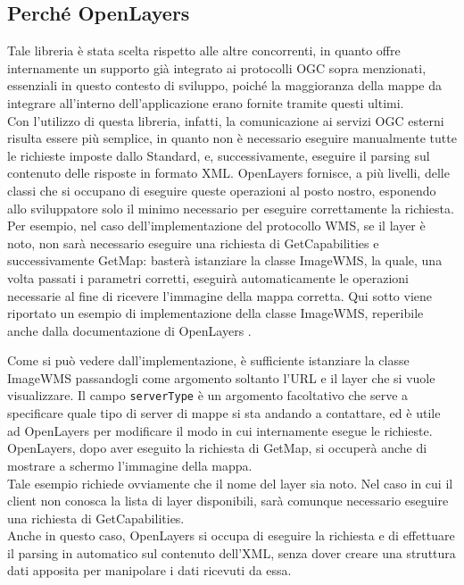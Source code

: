\subsection{Perché OpenLayers}

Tale libreria è stata scelta rispetto alle altre concorrenti, in quanto offre internamente un supporto già integrato ai protocolli OGC sopra menzionati, essenziali in questo contesto di sviluppo, poiché la maggioranza della mappe da integrare all'interno dell'applicazione erano fornite tramite questi ultimi.
\\Con l'utilizzo di questa libreria, infatti, la comunicazione ai servizi OGC esterni risulta essere più semplice, in quanto non è necessario eseguire manualmente tutte le richieste imposte dallo Standard, e, successivamente, eseguire il parsing sul contenuto delle risposte in formato XML. OpenLayers fornisce, a più livelli, delle classi che si occupano di eseguire queste operazioni al posto nostro, esponendo allo sviluppatore solo il minimo necessario per eseguire correttamente la richiesta.
\\Per esempio, nel caso dell'implementazione del protocollo WMS, se il layer è noto, non sarà necessario eseguire una richiesta di GetCapabilities e successivamente GetMap: basterà istanziare la classe ImageWMS, la quale, una volta passati i parametri corretti, eseguirà automaticamente le operazioni necessarie al fine di ricevere l'immagine della mappa corretta. Qui sotto viene riportato un esempio di implementazione della classe ImageWMS, reperibile anche dalla documentazione di OpenLayers \cite{DocumentazioneOpenLayersWMS}.

Come si può vedere dall'implementazione, è sufficiente istanziare la classe ImageWMS passandogli come argomento soltanto l'URL e il layer che si vuole visualizzare. Il campo \verb|serverType| è un argomento facoltativo che serve a specificare quale tipo di server di mappe si sta andando a contattare, ed è utile ad OpenLayers per modificare il modo in cui internamente esegue le richieste. OpenLayers, dopo aver eseguito la richiesta di GetMap, si occuperà anche di mostrare a schermo l'immagine della mappa.
\\Tale esempio richiede ovviamente che il nome del layer sia noto. Nel caso in cui il client non conosca la lista di layer disponibili, sarà comunque necessario eseguire una richiesta di GetCapabilities.
\\Anche in questo caso, OpenLayers si occupa di eseguire la richiesta e di effettuare il parsing in automatico sul contenuto dell'XML, senza dover creare una struttura dati apposita per manipolare i dati ricevuti da essa.
